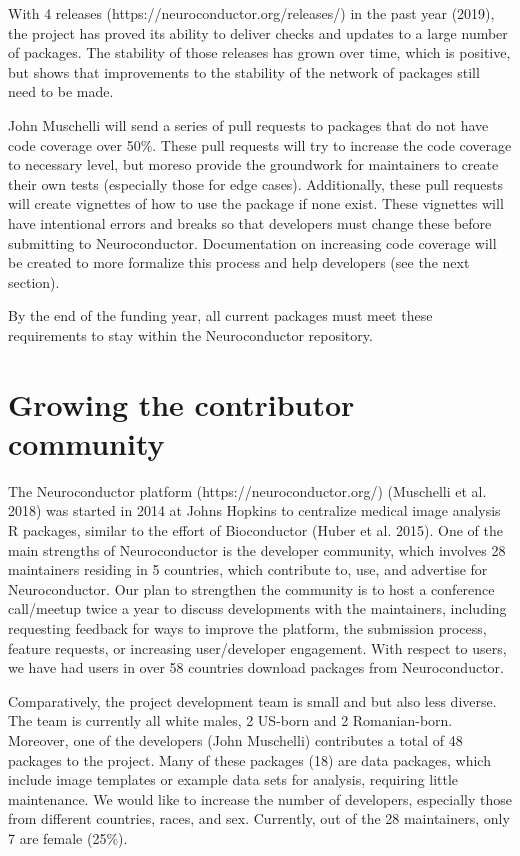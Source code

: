 \documentclass[]{elsarticle} %
\begin{document}
With 4 releases (https://neuroconductor.org/releases/) in the past year (2019), the project has proved its ability to deliver checks and updates to a large number of packages. The stability of those releases has grown over time, which is positive, but shows that improvements to the stability of the network of packages still need to be made.

John Muschelli will send a series of pull requests to packages that do not have code coverage over 50\%. These pull requests will try to increase the code coverage to necessary level, but moreso provide the groundwork for maintainers to create their own tests (especially those for edge cases). Additionally, these pull requests will create vignettes of how to use the package if none exist. These vignettes will have intentional errors and breaks so that developers must change these before submitting to Neuroconductor. Documentation on increasing code coverage will be created to more formalize this process and help developers (see the next section).

By the end of the funding year, all current packages must meet these requirements to stay within the Neuroconductor repository.

\hypertarget{growing-the-contributor-community}{%
\section{Growing the contributor community}\label{growing-the-contributor-community}}

The Neuroconductor platform (https://neuroconductor.org/) (Muschelli et al. 2018) was started in 2014 at Johns Hopkins to centralize medical image analysis R packages, similar to the effort of Bioconductor (Huber et al. 2015). One of the main strengths of Neuroconductor is the developer community, which involves 28 maintainers residing in 5 countries, which contribute to, use, and advertise for Neuroconductor. Our plan to strengthen the community is to host a conference call/meetup twice a year to discuss developments with the maintainers, including requesting feedback for ways to improve the platform, the submission process, feature requests, or increasing user/developer engagement. With respect to users, we have had users in over 58 countries download packages from Neuroconductor.

Comparatively, the project development team is small and but also less diverse. The team is currently all white males, 2 US-born and 2 Romanian-born. Moreover, one of the developers (John Muschelli) contributes a total of 48 packages to the project. Many of these packages (18) are data packages, which include image templates or example data sets for analysis, requiring little maintenance. We would like to increase the number of developers, especially those from different countries, races, and sex. Currently, out of the 28 maintainers, only 7 are female (25\%).
\end{document}
